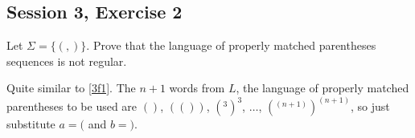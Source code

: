 \subsection{Session 3, Exercise 2}


Let $\Sigma = \{(,)\}$. Prove that the language of properly matched parentheses sequences is not regular.


Quite similar to \ref{3f1}. The $n+1$ words from $L$, the language of properly matched parentheses to be used are $()$, $(())$, $(^3)^3$, $\dots$, $(^{(n+1)})^{(n+1)}$, so just substitute $a = ($ and $b = )$.